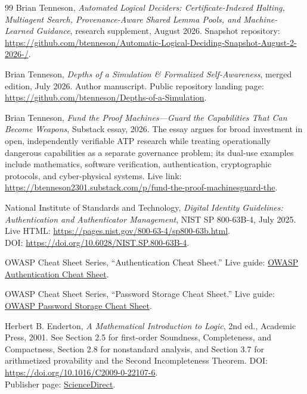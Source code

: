 \documentclass[11pt,openany]{book}
\theoremstyle{definition}
\theoremstyle{remark}
\begin{document}
\begin{thebibliography}{99}
Brian Tenneson,
\emph{Automated Logical Deciders: Certificate-Indexed Halting, Multiagent Search, Provenance-Aware Shared Lemma Pools, and Machine-Learned Guidance}, research supplement, August 2026.
Snapshot repository: \href{https://github.com/btenneson/Automatic-Logical-Deciding-Snapshot-August-2-2026-}{https://github.com/btenneson/Automatic-Logical-Deciding-Snapshot-August-2-2026-/}.

Brian Tenneson,
\emph{Depths of a Simulation \& Formalized Self-Awareness}, merged edition, July 2026. Author manuscript. Public repository landing page: \href{https://github.com/btenneson/Depths-of-a-Simulation}{https://github.com/btenneson/Depths-of-a-Simulation}.



Brian Tenneson,
\emph{Fund the Proof Machines---Guard the Capabilities That Can Become Weapons}, Substack essay, 2026. The essay argues for broad investment in open, independently verifiable ATP research while treating operationally dangerous capabilities as a separate governance problem; its dual-use examples include mathematics, software verification, authentication, cryptographic protocols, and cyber-physical systems.
Live link: \href{https://btenneson2301.substack.com/p/fund-the-proof-machinesguard-the}{https://btenneson2301.substack.com/p/fund-the-proof-machinesguard-the}.

National Institute of Standards and Technology,
\emph{Digital Identity Guidelines: Authentication and Authenticator Management}, NIST SP 800-63B-4, July 2025.
Live HTML: \href{https://pages.nist.gov/800-63-4/sp800-63b.html}{https://pages.nist.gov/800-63-4/sp800-63b.html}.\\
DOI: \href{https://doi.org/10.6028/NIST.SP.800-63B-4}{https://doi.org/10.6028/NIST.SP.800-63B-4}.

OWASP Cheat Sheet Series,
``Authentication Cheat Sheet.''
Live guide: \href{https://cheatsheetseries.owasp.org/cheatsheets/Authentication_Cheat_Sheet.html}{OWASP Authentication Cheat Sheet}.

OWASP Cheat Sheet Series,
``Password Storage Cheat Sheet.''
Live guide: \href{https://cheatsheetseries.owasp.org/cheatsheets/Password_Storage_Cheat_Sheet.html}{OWASP Password Storage Cheat Sheet}.



Herbert B. Enderton,
\emph{A Mathematical Introduction to Logic}, 2nd ed., Academic Press, 2001.
See Section 2.5 for first-order Soundness, Completeness, and Compactness, Section 2.8 for nonstandard analysis, and Section 3.7 for arithmetized provability and the Second Incompleteness Theorem.
DOI: \href{https://doi.org/10.1016/C2009-0-22107-6}{https://doi.org/10.1016/C2009-0-22107-6}.\\
Publisher page: \href{https://www.sciencedirect.com/book/9780122384523/a-mathematical-introduction-to-logic}{ScienceDirect}.


\end{thebibliography}
\end{document}
